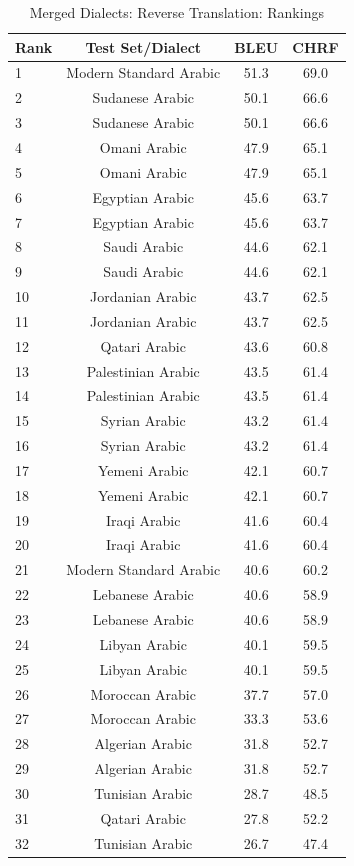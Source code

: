 \begin{table}[htbp]
\centering
\caption{Merged Dialects: Reverse Translation: Rankings}
\label{tab:testset_ranking_reverse_merged}
\begin{tabular}{l@{\hspace{3pt}}c@{\hspace{3pt}}c@{\hspace{3pt}}c}
\toprule
Rank & Test Set/Dialect & BLEU & CHRF \\
\midrule
1 & Modern Standard Arabic  & 51.3 & 69.0 \\
2 & Sudanese Arabic & 50.1 & 66.6 \\
3 & Sudanese Arabic  & 50.1 & 66.6 \\
4 & Omani Arabic & 47.9 & 65.1 \\
5 & Omani Arabic  & 47.9 & 65.1 \\
6 & Egyptian Arabic & 45.6 & 63.7 \\
7 & Egyptian Arabic  & 45.6 & 63.7 \\
8 & Saudi Arabic & 44.6 & 62.1 \\
9 & Saudi Arabic  & 44.6 & 62.1 \\
10 & Jordanian Arabic & 43.7 & 62.5 \\
11 & Jordanian Arabic  & 43.7 & 62.5 \\
12 & Qatari Arabic  & 43.6 & 60.8 \\
13 & Palestinian Arabic & 43.5 & 61.4 \\
14 & Palestinian Arabic  & 43.5 & 61.4 \\
15 & Syrian Arabic & 43.2 & 61.4 \\
16 & Syrian Arabic  & 43.2 & 61.4 \\
17 & Yemeni Arabic & 42.1 & 60.7 \\
18 & Yemeni Arabic  & 42.1 & 60.7 \\
19 & Iraqi Arabic & 41.6 & 60.4 \\
20 & Iraqi Arabic  & 41.6 & 60.4 \\
21 & Modern Standard Arabic & 40.6 & 60.2 \\
22 & Lebanese Arabic & 40.6 & 58.9 \\
23 & Lebanese Arabic  & 40.6 & 58.9 \\
24 & Libyan Arabic & 40.1 & 59.5 \\
25 & Libyan Arabic  & 40.1 & 59.5 \\
26 & Moroccan Arabic  & 37.7 & 57.0 \\
27 & Moroccan Arabic & 33.3 & 53.6 \\
28 & Algerian Arabic & 31.8 & 52.7 \\
29 & Algerian Arabic  & 31.8 & 52.7 \\
30 & Tunisian Arabic  & 28.7 & 48.5 \\
31 & Qatari Arabic & 27.8 & 52.2 \\
32 & Tunisian Arabic & 26.7 & 47.4 \\
\bottomrule
\end{tabular}
\end{table}